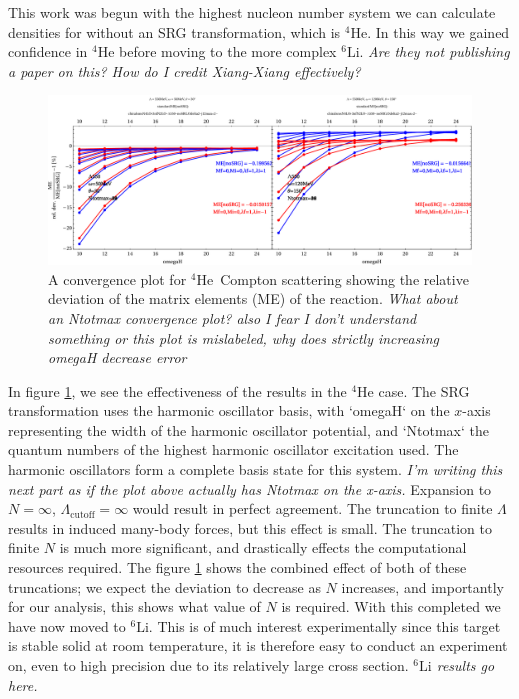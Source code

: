 \documentclass[a4paper,11pt]{article}
\newcommand{\LiS}{{}^{6} \mathrm{Li} }
\newcommand{\HeF}{{}^{4} \mathrm{He}}
\newcommand{\ques}[1]{\color{red}\textit{ #1 }\color{black}}
\begin{document}
This work was begun with the highest nucleon number system we can
calculate densities for without an SRG transformation, which is
$\HeF$. In this way we gained confidence in $\HeF$ before moving
to the more complex $\LiS$.
\ques{Are they not publishing a paper on this? How do I credit
Xiang-Xiang effectively?}
\begin{figure}[h!]
  \begin{center}
    \includegraphics[width=\linewidth]{SRG-Converge-Double.pdf}
    \caption{A convergence plot for $\HeF$\, Compton scattering
    showing the relative deviation of the matrix elements (ME) of the reaction.\ques{What about an Ntotmax convergence plot? also I fear I don't understand something or this plot is mislabeled, why does strictly increasing omegaH decrease error}}
    \label{fig:SRGConverge4He}
  \end{center}
\end{figure}
In figure \ref{fig:SRGConverge4He}, we see the effectiveness of the results in the $\HeF$ case.
The SRG transformation uses the harmonic oscillator basis,
with `omegaH` on the $x$-axis representing the width of the harmonic
oscillator potential, and `Ntotmax` the quantum numbers of the highest harmonic oscillator excitation used.
The harmonic oscillators form a complete basis state for this system.
\ques{I'm writing this next part as if the plot above actually has Ntotmax on the x-axis.}
Expansion to $N=\infty$, $\Lambda_{\text{cutoff}}=\infty$ would result in perfect agreement.
The truncation to finite $\Lambda$ results in induced many-body forces, but this effect is small.
The truncation to finite $N$ is much more significant, and drastically effects the computational resources required.
The figure \ref{fig:SRGConverge4He} shows the combined effect of both of these truncations; we expect the deviation to decrease as $N$ increases, and importantly for our analysis, this shows what value of $N$ is required.
With this completed we have now moved to $\LiS$.
This is of much interest experimentally since this target is stable solid at room temperature,
it is therefore easy to conduct an experiment on, even to high precision due to its relatively large
cross section.
\ques{$\LiS$ results go here.}
\end{document}
